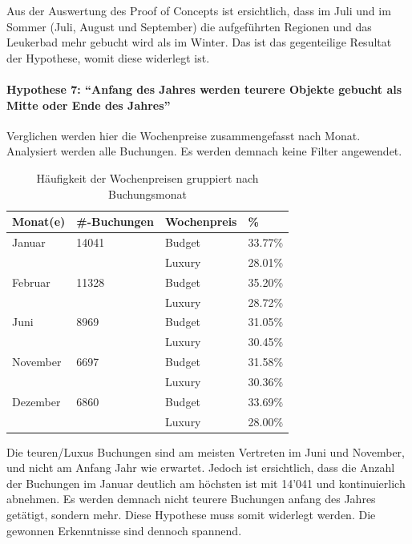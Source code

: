 Aus der Auswertung des Proof of Concepts ist ersichtlich, dass im Juli und im Sommer (Juli, August und September) die aufgeführten Regionen und das Leukerbad mehr gebucht wird als im Winter. Das ist das gegenteilige Resultat der Hypothese, womit diese widerlegt ist.

\paragraph{Hypothese 7: "`Anfang des Jahres werden teurere Objekte gebucht als Mitte oder Ende des Jahres"'} Verglichen werden hier die Wochenpreise zusammengefasst nach Monat. Analysiert werden alle Buchungen. Es werden demnach keine Filter angewendet.
\begin{table}[H] 
	\caption{Häufigkeit der Wochenpreisen gruppiert nach Buchungsmonat}
	\centering
	\label{fig:testingfazit:testing:hypothesen:7}
	\begin{tabular}{ | l | l | l | l | } 
		\hline 
		\rowcolor{tableheadcolor}
		\bfseries Monat(e) & \bfseries \#-Buchungen & \bfseries Wochenpreis & \bfseries \% \\ \hline 
		Januar & 14041 & Budget & 33.77\% \\ \cline{3-4} 
		 & & Luxury & 28.01\% \\ \hline
		 Februar & 11328 & Budget & 35.20\% \\ \cline{3-4} 
 		 & & Luxury & 28.72\% \\ \hline
		 Juni & 8969 & Budget & 31.05\% \\ \cline{3-4} 
 		 & & Luxury & 30.45\% \\ \hline
		 November & 6697 & Budget & 31.58\% \\ \cline{3-4}
 		 & & Luxury & 30.36\% \\ \hline
		 Dezember & 6860 & Budget & 33.69\% \\ \cline{3-4} 
 		 & & Luxury & 28.00\% \\ \hline		 
	\end{tabular}
\end{table}

Die teuren/Luxus Buchungen sind am meisten Vertreten im Juni und November, und nicht am Anfang Jahr wie erwartet. Jedoch ist ersichtlich, dass die Anzahl der Buchungen im Januar deutlich am höchsten ist mit 14'041 und kontinuierlich abnehmen. Es werden demnach nicht teurere Buchungen anfang des Jahres getätigt, sondern mehr. Diese Hypothese muss somit widerlegt werden. Die gewonnen Erkenntnisse sind dennoch spannend. 

